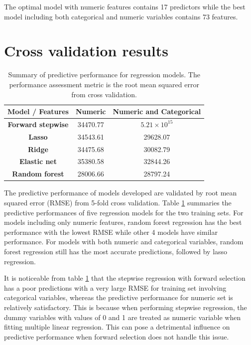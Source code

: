 \documentclass[letterpaper,12pt,twoside,]{pinp}
\begin{document}
The optimal model with numeric features contains 17 predictors while the
best model including both categorical and numeric variables contains 73
features.

\hypertarget{cross-validation-results}{%
\section{Cross validation results}\label{cross-validation-results}}

\begin{table}
\begin{tabular}{ |c|c|c| } 
\hline
\textbf{Model / Features} & \textbf{Numeric} & \textbf{Numeric and Categorical} \\
\hline
\textbf{Forward stepwise} & 34470.77 & $5.21\times 10^{15}$ \\ 
\textbf{Lasso} & 34543.61 & 29628.07 \\
\textbf{Ridge} & 34475.68 & 30082.79 \\
\textbf{Elastic net} & 35380.58 & 32844.26 \\
\textbf{Random forest} & 28006.66 & 28797.24\\
\hline
\end{tabular}
\centering
\caption{Summary of predictive performance for regression models. The performance assessment metric is the root mean squared error from cross validation.}
\label{table:cv_errors}
\end{table}

The predictive performance of models developed are validated by root
mean squared error (RMSE) from 5-fold cross validation. Table
\ref{table:cv_errors} summaries the predictive performances of five
regression models for the two training sets. For models including only
numeric features, random forest regression has the best performance with
the lowest RMSE while other 4 models have similar performance. For
models with both numeric and categorical variables, random forest
regression still has the most accurate predictions, followed by lasso
regression.

It is noticeable from table \ref{table:cv_errors} that the stepwise
regression with forward selection has a poor predictions with a very
large RMSE for training set involving categorical variables, whereas the
predictive performance for numeric set is relatively satisfactory. This
is because when performing stepwise regression, the dummy variables with
values of 0 and 1 are treated as numeric variable when fitting multiple
linear regression. This can pose a detrimental influence on predictive
performance when forward selection does not handle this issue.
\end{document}
